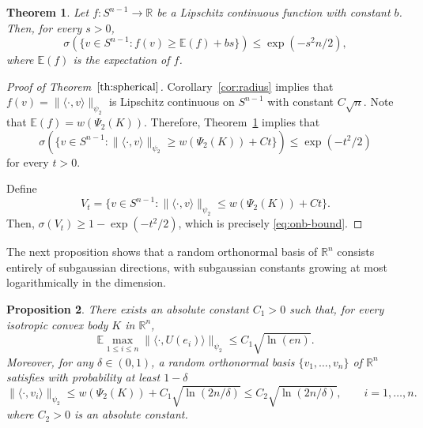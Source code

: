 \documentclass[11pt,leqno]{article}
\newtheorem{theorem}{Theorem}[section]
\newtheorem{proposition}[theorem]{Proposition}
\theoremstyle{definition}
\numberwithin{equation}{section}
\newcommand{\ls}{\leqslant}
\newcommand{\gr}{\geqslant}
\begin{document}
\begin{theorem}\label{th:sphere-expectation} Let $f:S^{n-1}\to {\mathbb R}$ be a Lipschitz continuous function with constant $b$. Then, for every $s>0$,
\begin{equation*}\sigma\left ( \{v\in S^{n-1}:f(v)\gr {\mathbb E}(f)+bs\}\right )\ls \exp (-s^2n/2),\end{equation*}
where ${\mathbb E}(f)$ is the expectation of $f$.
\end{theorem}

\begin{proof}[Proof of Theorem~$\ref{th:spherical}$]Corollary~\ref{cor:radius} implies that $f(v)=\|\langle \cdot, v\rangle\|_{\psi_2}$ 
is Lipschitz continuous on $S^{n-1}$ with constant $C\sqrt{n}$.
Note that $\mathbb{E}(f)=w(\Psi_2(K))$. Therefore, Theorem~\ref{th:sphere-expectation} implies that
\begin{equation*}\sigma\left ( \{v\in S^{n-1}:\|\langle\cdot,v\rangle\|_{\psi_2}\gr w(\Psi_2(K))+Ct
\}\right )\ls \exp (-t^2/2)\end{equation*}
for every $t>0$.

Define
\[V_t=\big\{v\in S^{n-1}:\|\langle \cdot, v\rangle\|_{\psi_2}\ls w(\Psi_2(K))+Ct\big\}.\]
Then, $\sigma(V_t)\gr 1-\exp(-t^2/2)$, which is precisely \eqref{eq:onb-bound}.
\end{proof}


The next proposition shows that a random orthonormal basis of $\mathbb{R}^n$ consists entirely of subgaussian directions,
with subgaussian constants growing at most logarithmically in the dimension.


\begin{proposition}\label{prop:spherical}
There exists an absolute constant $C_1>0$ such that, for every isotropic convex body $K$ in $\mathbb{R}^n$, 
$$\mathbb{E} \max_{1\ls i\ls n} \|\langle \cdot,U(e_i)\rangle \|_{\psi_2}  \ls C_1\sqrt{\ln (en)}.$$
Moreover, for any $\delta\in (0,1)$, a random orthonormal basis $\{v_1,\ldots ,v_n\}$ of $\mathbb{R}^n$ satisfies with probability at least $1-\delta$ 
\begin{equation}\label{eq:random-basis}
\|\langle\cdot,v_i\rangle\|_{\psi_2}\ls w(\Psi_2(K))+C_1\sqrt{\ln(2n/\delta)}\ls C_2\sqrt{\ln(2n/\delta)},\qquad i=1,\ldots ,n.
\end{equation}
where $C_2>0$ is an absolute constant. 
\end{proposition}
\end{document}
